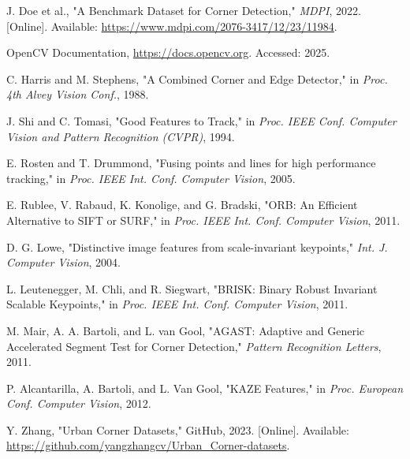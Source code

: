 \documentclass[journal]{IEEEtran}
\begin{document}




\begin{thebibliography}{1}

    J. Doe et al., "A Benchmark Dataset for Corner Detection," \textit{MDPI}, 2022. [Online]. Available: \url{https://www.mdpi.com/2076-3417/12/23/11984}.

    OpenCV Documentation, \url{https://docs.opencv.org}. Accessed: 2025.

    C. Harris and M. Stephens, "A Combined Corner and Edge Detector," in \textit{Proc. 4th Alvey Vision Conf.}, 1988.

    J. Shi and C. Tomasi, "Good Features to Track," in \textit{Proc. IEEE Conf. Computer Vision and Pattern Recognition (CVPR)}, 1994.

    E. Rosten and T. Drummond, "Fusing points and lines for high performance tracking," in \textit{Proc. IEEE Int. Conf. Computer Vision}, 2005.

    E. Rublee, V. Rabaud, K. Konolige, and G. Bradski, "ORB: An Efficient Alternative to SIFT or SURF," in \textit{Proc. IEEE Int. Conf. Computer Vision}, 2011.

    D. G. Lowe, "Distinctive image features from scale-invariant keypoints," \textit{Int. J. Computer Vision}, 2004.

    L. Leutenegger, M. Chli, and R. Siegwart, "BRISK: Binary Robust Invariant Scalable Keypoints," in \textit{Proc. IEEE Int. Conf. Computer Vision}, 2011.

    M. Mair, A. A. Bartoli, and L. van Gool, "AGAST: Adaptive and Generic Accelerated Segment Test for Corner Detection," \textit{Pattern Recognition Letters}, 2011.

    P. Alcantarilla, A. Bartoli, and L. Van Gool, "KAZE Features," in \textit{Proc. European Conf. Computer Vision}, 2012.

    Y. Zhang, "Urban Corner Datasets," GitHub, 2023. [Online]. Available: \url{https://github.com/yangzhangcv/Urban_Corner-datasets}.

\end{thebibliography}
\end{document}
